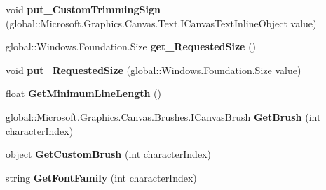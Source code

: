 \begin{DoxyCompactItemize}
void {\bfseries put\+\_\+\+Custom\+Trimming\+Sign} (global\+::\+Microsoft.\+Graphics.\+Canvas.\+Text.\+I\+Canvas\+Text\+Inline\+Object value)
\item 
\mbox{\label{class_microsoft_1_1_graphics_1_1_canvas_1_1_text_1_1_canvas_text_layout_adebf612a8df4663884f5d4a38f41ea39}} 
global\+::\+Windows.\+Foundation.\+Size {\bfseries get\+\_\+\+Requested\+Size} ()
\item 
\mbox{\label{class_microsoft_1_1_graphics_1_1_canvas_1_1_text_1_1_canvas_text_layout_a2f3f911ee1fbeb9d18674696d30e71ad}} 
void {\bfseries put\+\_\+\+Requested\+Size} (global\+::\+Windows.\+Foundation.\+Size value)
\item 
\mbox{\label{class_microsoft_1_1_graphics_1_1_canvas_1_1_text_1_1_canvas_text_layout_a238de0e21932bea51610979705559db4}} 
float {\bfseries Get\+Minimum\+Line\+Length} ()
\item 
\mbox{\label{class_microsoft_1_1_graphics_1_1_canvas_1_1_text_1_1_canvas_text_layout_a0c810e107e704b45bc815cf10ec80e67}} 
global\+::\+Microsoft.\+Graphics.\+Canvas.\+Brushes.\+I\+Canvas\+Brush {\bfseries Get\+Brush} (int character\+Index)
\item 
\mbox{\label{class_microsoft_1_1_graphics_1_1_canvas_1_1_text_1_1_canvas_text_layout_ab9ac76cc2bcb25f7196995587caf4e68}} 
object {\bfseries Get\+Custom\+Brush} (int character\+Index)
\item 
\mbox{\label{class_microsoft_1_1_graphics_1_1_canvas_1_1_text_1_1_canvas_text_layout_af4f53cf9d9dddc4bfa0669a57c6a4084}} 
string {\bfseries Get\+Font\+Family} (int character\+Index)
\item 
\mbox{\label{class_microsoft_1_1_graphics_1_1_canvas_1_1_text_1_1_canvas_text_layout_a0597b8dfd8edb6f68a71f116703648c7}} 

\end{DoxyCompactItemize}
